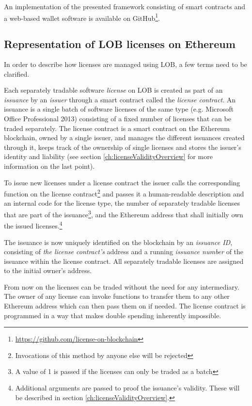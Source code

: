 \documentclass[a4paper]{article}
\begin{document}
An implementation of the presented framework consisting of smart contracts and a web-based wallet software is available on GitHub\footnote{\url{https://github.com/license-on-blockchain}}.




\subsection{Representation of LOB licenses on Ethereum}
\label{ch:licenseRepresentationOverview}

In order to describe how licenses are managed using LOB, a few terms need to be clarified.

Each separately tradable software \emph{license} on LOB is created as part of an \emph{issuance} by an \emph{issuer} through a smart contract called the \emph{license contract}. An issuance is a single batch of software licenses of the same type (e.g. Microsoft Office Professional 2013) consisting of a fixed number of licenses that can be traded separately. The license contract is a smart contract on the Ethereum blockchain, owned by a single issuer, and manages the different issuances created through it, keeps track of the ownership of single licenses and stores the issuer's identity and liability (see section \ref{ch:licenseValidityOverview} for more information on the last point).

To issue new licenses under a license contract the issuer calls the corresponding function on the license contract\footnote{Invocations of this method by anyone else will be rejected} and passes it a human-readable description and an internal code for the license type, the number of separately tradable licenses that are part of the issuance\footnote{A value of 1 is passed if the licenses can only be traded as a batch}, and the Ethereum address that shall initially own the issued licenses.\footnote{Additional arguments are passed to proof the issuance's validity. These will be described in section \ref{ch:licenseValidityOverview}.}

The issuance is now uniquely identified on the blockchain by an \emph{issuance ID}, consisting of \emph{the license contract's} address and a running \emph{issuance number} of the issuance within the license contract. All separately tradable licenses are assigned to the initial owner's address.

From now on the licenses can be traded without the need for any intermediary. The owner of any license can invoke functions to transfer them to any other Ethereum address which can then pass them on if needed. The license contract is programmed in a way that makes double spending inherently impossible.
\end{document}
